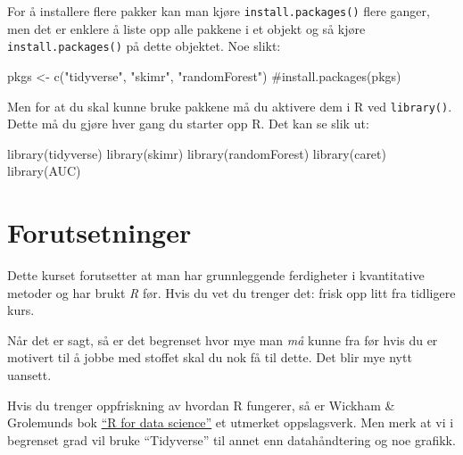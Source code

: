 \documentclass[
  letterpaper,
  DIV=11,
  numbers=noendperiod]{scrreprt}
\newenvironment{Shaded}{\begin{snugshade}}{\end{snugshade}}
\newcommand{\CommentTok}[1]{\textcolor[rgb]{0.37,0.37,0.37}{#1}}
\newcommand{\FunctionTok}[1]{\textcolor[rgb]{0.28,0.35,0.67}{#1}}
\newcommand{\NormalTok}[1]{\textcolor[rgb]{0.00,0.23,0.31}{#1}}
\newcommand{\OtherTok}[1]{\textcolor[rgb]{0.00,0.23,0.31}{#1}}
\newcommand{\StringTok}[1]{\textcolor[rgb]{0.13,0.47,0.30}{#1}}
\theoremstyle{definition}
\theoremstyle{remark}
\begin{document}
For å installere flere pakker kan man kjøre \texttt{install.packages()}
flere ganger, men det er enklere å liste opp alle pakkene i et objekt og
så kjøre \texttt{install.packages()} på dette objektet. Noe slikt:

\begin{Shaded}
\begin{Highlighting}[]
\NormalTok{pkgs }\OtherTok{\textless{}{-}} \FunctionTok{c}\NormalTok{(}\StringTok{"tidyverse"}\NormalTok{, }\StringTok{"skimr"}\NormalTok{, }\StringTok{"randomForest"}\NormalTok{)}
\CommentTok{\#install.packages(pkgs)}
\end{Highlighting}
\end{Shaded}

Men for at du skal kunne bruke pakkene må du aktivere dem i R ved
\texttt{library()}. Dette må du gjøre hver gang du starter opp R. Det
kan se slik ut:

\begin{Shaded}
\begin{Highlighting}[]
\FunctionTok{library}\NormalTok{(tidyverse)}
\FunctionTok{library}\NormalTok{(skimr)}
\FunctionTok{library}\NormalTok{(randomForest)}
\FunctionTok{library}\NormalTok{(caret)}
\FunctionTok{library}\NormalTok{(AUC)}
\end{Highlighting}
\end{Shaded}

\hypertarget{forutsetninger}{%
\section*{Forutsetninger}\label{forutsetninger}}


Dette kurset forutsetter at man har grunnleggende ferdigheter i
kvantitative metoder og har brukt \emph{R} før. Hvis du vet du trenger
det: frisk opp litt fra tidligere kurs.

Når det er sagt, så er det begrenset hvor mye man \emph{må} kunne fra
før hvis du er motivert til å jobbe med stoffet skal du nok få til
dette. Det blir mye nytt uansett.

Hvis du trenger oppfriskning av hvordan R fungerer, så er Wickham \&
Grolemunds bok \href{https://r4ds.had.co.nz/}{``R for data science''} et
utmerket oppslagsverk. Men merk at vi i begrenset grad vil bruke
``Tidyverse'' til annet enn datahåndtering og noe grafikk.

\end{document}
